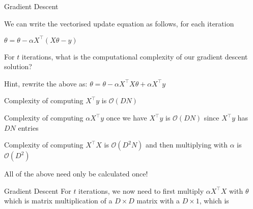 \documentclass{beamer}
\begin{document}
\begin{frame}{Gradient Descent}


We can write the vectorised update equation as follows, for each iteration

\(\theta=\theta - \alpha X^{\top}(X \theta-y)\) 


\pause For $t$ iterations, what is the computational complexity of our gradient descent solution?

\pause Hint, rewrite the above as: \(\theta=\theta - \alpha X^{\top}X \theta+ \alpha X^{\top}y\) 

\pause Complexity of computing $X^{\top}y$ is $\mathcal{O}(DN)$

\pause Complexity of computing $\alpha X^{\top}y$ once we have $X^{\top}y$ is $\mathcal{O}(DN)$ since  $X^{\top}y$ has $DN$ entries

\pause Complexity of computing $X^{\top}X$ is $\mathcal{O}(D^2N)$ and then multiplying with $\alpha$ is  $\mathcal{O}(D^2)$

\pause All of the above need only be calculated once!



\end{frame}



\begin{frame}{Gradient Descent}
\pause For $t$ iterations, we now need to first multiply  $\alpha X^{\top}X$ with $\theta$ which is matrix multiplication of a $D \times D$ matrix with a $D \times 1$, which is 
\end{frame}
\end{document}
